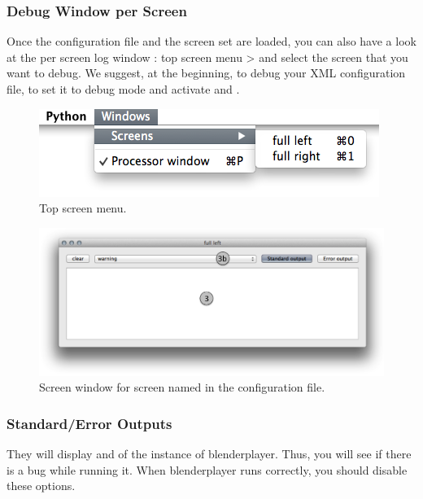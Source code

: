 \documentclass[a4,10pt,openany,oneside]{sphinxmanual}
\begin{document}
\subsubsection{Debug Window per Screen}
\label{components/user-interface:debug-window-per-screen}
Once the configuration file and the screen set are loaded, you can also have a look at the per screen log window : top screen menu  \textgreater{}  and select the screen that you want to debug. We suggest, at the beginning, to debug your XML configuration file, to set it to debug mode and activate  and .
\begin{figure}[htbp]
\centering
\capstart

\includegraphics{select-screen.png}
\caption{Top screen  menu.}\end{figure}
\begin{figure}[htbp]
\centering
\capstart

\includegraphics{screen-window.png}
\caption{Screen window for screen named  in the configuration file.}\end{figure}


\subsubsection{Standard/Error Outputs}
\label{components/user-interface:standard-error-outputs}
They will display  and  of the instance of blenderplayer. Thus, you will see if there is a bug while running it. When blenderplayer runs correctly, you should disable these options.
\end{document}
